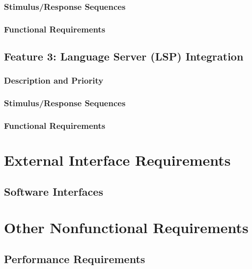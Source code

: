 \documentclass[
]{article}
\begin{document}
\subsubsection{Stimulus/Response
Sequences}\label{stimulusresponse-sequences-1}

\subsubsection{Functional Requirements}\label{functional-requirements-1}

\subsection{Feature 3: Language Server (LSP)
Integration}\label{feature-3-language-server-lsp-integration}

\subsubsection{Description and
Priority}\label{description-and-priority-2}

\subsubsection{Stimulus/Response
Sequences}\label{stimulusresponse-sequences-2}

\subsubsection{Functional Requirements}\label{functional-requirements-2}

\section{External Interface
Requirements}\label{external-interface-requirements}

\subsection{Software Interfaces}\label{software-interfaces}

\section{Other Nonfunctional
Requirements}\label{other-nonfunctional-requirements}

\subsection{Performance Requirements}\label{performance-requirements}
\end{document}
